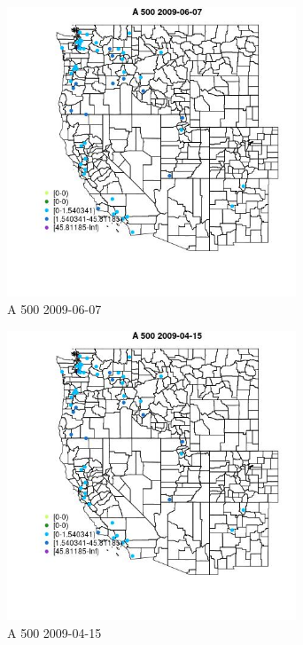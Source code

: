 \begin{figure} 
\centering  
\includegraphics[width=0.77\textwidth]{Code_Outputs/Report_ML_input_PM25_Step4_part_e_de_duplicated_aves_MapObsA_5002009-06-07.jpg} 
\caption{\label{fig:Report_ML_input_PM25_Step4_part_e_de_duplicated_avesMapObsA_5002009-06-07}A 500 2009-06-07} 
\end{figure} 
 

\begin{figure} 
\centering  
\includegraphics[width=0.77\textwidth]{Code_Outputs/Report_ML_input_PM25_Step4_part_e_de_duplicated_aves_MapObsA_5002009-04-15.jpg} 
\caption{\label{fig:Report_ML_input_PM25_Step4_part_e_de_duplicated_avesMapObsA_5002009-04-15}A 500 2009-04-15} 
\end{figure} 
 

